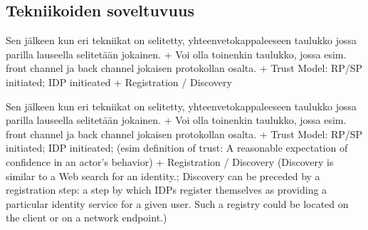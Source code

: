 \documentclass[finnish,gradu]{tktltiki}
\begin{document}





  \subsection{Tekniikoiden soveltuvuus} %
  \label{sub:tekniikoiden_yhtäläisyydet}

  Sen jälkeen kun eri tekniikat on selitetty, yhteenvetokappaleeseen taulukko jossa parilla lauseella selitetään jokainen.
  + Voi olla toinenkin taulukko, jossa esim. front channel ja back channel jokaisen protokollan osalta.
  + Trust Model: RP/SP initiated; IDP initieated %
  + Registration / Discovery %




    Sen jälkeen kun eri tekniikat on selitetty, yhteenvetokappaleeseen taulukko jossa parilla lauseella selitetään jokainen.
    + Voi olla toinenkin taulukko, jossa esim. front channel ja back channel jokaisen protokollan osalta.
    + Trust Model: RP/SP initiated; IDP initieated; (esim definition of trust: A reasonable expectation of confidence in an actor’s behavior)
    + Registration / Discovery (Discovery is similar to a Web search for an identity.; Discovery can be preceded by a registration step: a step by which IDPs register themselves as providing a particular identity service for a given user. Such a registry could be located on the client or on a network endpoint.)
\end{document}
